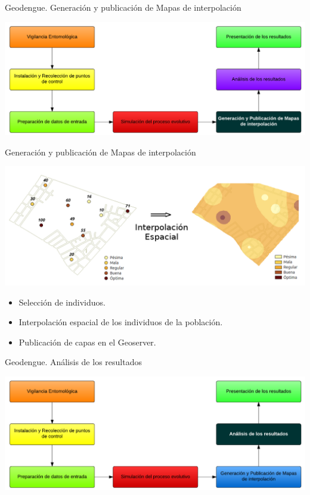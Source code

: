 \begin{frame}[c]{Geodengue. Generación y publicación de Mapas de interpolación}
\begin{center}
    \includegraphics[width=\textwidth]{./graphics/propuesta-mapas.png}
\end{center}
\end{frame}

\begin{frame}[c]{Generación y publicación de Mapas de interpolación}
\begin{center}
    \includegraphics[width=\textwidth]{./graphics/identificacion-focos.png}
    \begin{itemize}
      \item Selección de individuos.
      \item Interpolación espacial de los individuos de la población.
      \item Publicación de capas en el Geoserver.
    \end{itemize}
\end{center}
\end{frame}

\begin{frame}[c]{Geodengue. Análisis de los resultados}
\begin{center}
    \includegraphics[width=\textwidth]{./graphics/propuesta-analisis.png}
\end{center}
\end{frame}


